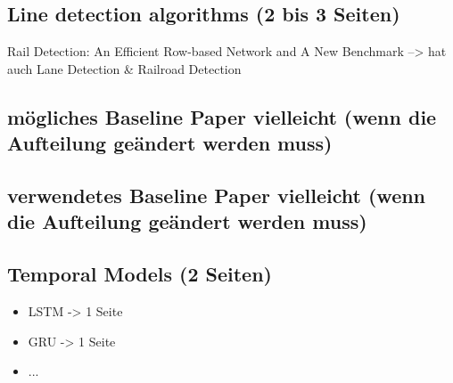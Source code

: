 \subsection{Line detection algorithms (2 bis 3 Seiten)}

Rail Detection: An Efficient Row-based Network and A New Benchmark --> hat auch Lane Detection \& Railroad Detection

\subsection{mögliches Baseline Paper vielleicht (wenn die Aufteilung geändert werden muss)}

\subsection{verwendetes Baseline Paper vielleicht (wenn die Aufteilung geändert werden muss)}

\subsection{Temporal Models (2 Seiten)}

\begin{itemize}
    \item LSTM -> 1 Seite
    \item GRU -> 1 Seite
    \item ...
\end{itemize}


\clearpage




\clearpage                                                       %





\clearpage                                                       %


